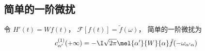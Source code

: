 \subsection{简单的一阶微扰}
令 $H'(t) = W f(t)$， $\mathcal F[f(t)] = \tilde f(\omega)$， 简单的一阶微扰为
\begin{equation}\label{TDPTc_eq1}
c_{\alpha'}^{(1)}(+\infty) = -\I\sqrt{2\pi} \mel{\alpha'}{W}{\alpha} \tilde f(-\omega_{\alpha'\alpha})
\end{equation}

